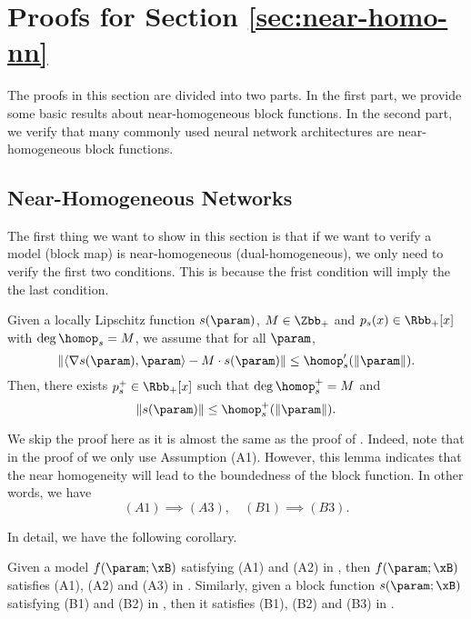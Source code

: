\section{Proofs for Section \ref{sec:near-homo-nn}}  

The proofs in this section are divided into two parts. In the first part, we provide some basic results about near-homogeneous block functions. In the second part, we verify that many commonly used neural network architectures are near-homogeneous block functions.


\subsection{Near-Homogeneous Networks} \label{sec:pf-near-homo-nn}

The first thing we want to show in this section is that if we want to verify a model (block map) is near-homogeneous (dual-homogeneous), we only need to verify the first two conditions. This is because the frist condition will imply the the last condition. 
\begin{lemma}
\label{lem: M-near homogeneity bound}
Given a locally Lipschitz function $ s(\param)$, $M\in \Zbb_+$ and $p_s(x) \in \Rbb_+[x]$ with $\deg \homop_s = M$, 
we assume that for all $\param$,
\[
  \|\langle \nabla s(\param ), \param \rangle - M \cdot s(\param)\| \le \homop_s^\prime (\|\param\|).
\]
Then, there exists $p_s^+ \in \Rbb_+[x]$ such that $\deg \homop_s^+ = M$ and
\[
    \|s(\param)\| \le \homop_s^+(\|\param\|). 
\]
\end{lemma}
We skip the proof here as it is almost the same as the proof of . Indeed, note that in the proof of  we only use Assumption (A1). However, this lemma indicates that the near homogeneity will lead to the boundedness of the block function. In other words, we have 
\[
    (A1)  \implies (A3),\quad  (B1) \implies (B3). 
\]

In detail, we have the following corollary.  
\begin{corollary}
\label{cor: Near homogeneity to boundedness}
Given a model $f(\param;\xB)$ satisfying (A1) and (A2) in , then $f(\param; \xB)$ satisfies (A1), (A2) and (A3) in . Similarly, given a block function $s(\param;\xB)$ satisfying (B1) and (B2) in , then it satisfies (B1), (B2) and (B3) in .
\end{corollary}

